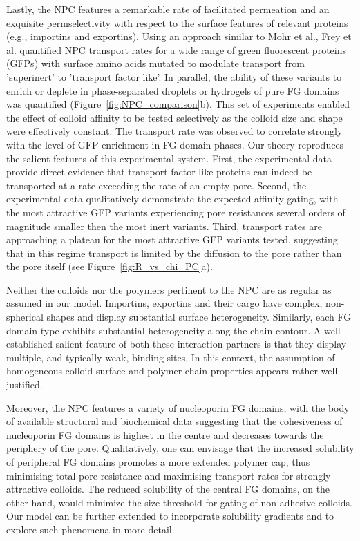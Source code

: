 \documentclass[12pt, a4paper]{article}
\begin{document}
Lastly, the NPC features a remarkable rate of facilitated permeation and an exquisite permselectivity with respect to the surface features of relevant proteins (e.g., importins and exportins).
Using an approach similar to Mohr et al., Frey et al. quantified NPC transport rates for a wide range of green fluorescent proteins (GFPs) with surface amino acids mutated to modulate transport from 'superinert' to 'transport factor like'.
In parallel, the ability of these variants to enrich or deplete in phase-separated droplets or hydrogels of pure FG domains was quantified (Figure~\ref{fig:NPC_comparison}b).
This set of experiments enabled the effect of colloid affinity to be tested selectively as the colloid size and shape were effectively constant.
The transport rate was observed to correlate strongly with the level of GFP enrichment in FG domain phases.
Our theory reproduces the salient features of this experimental system.
First, the experimental data provide direct evidence that transport-factor-like proteins can indeed be transported at a rate exceeding the rate of an empty pore.
Second, the experimental data qualitatively demonstrate the expected affinity gating, with the most attractive GFP variants experiencing pore resistances several orders of magnitude smaller then the most inert variants.
Third, transport rates are approaching a plateau for the most attractive GFP variants tested, suggesting that in this regime transport is limited by the diffusion to the pore rather than the pore itself (see Figure~\ref{fig:R_vs_chi_PC}a).

Neither the colloids nor the polymers pertinent to the NPC are as regular as assumed in our model.
Importins, exportins and their cargo have complex, non-spherical shapes and display substantial surface heterogeneity.
Similarly, each FG domain type exhibits substantial heterogeneity along the chain contour.
A well-established salient feature of both these interaction partners is that they display multiple, and typically weak, binding sites. In this context, the assumption of homogeneous colloid surface and polymer chain properties appears rather well justified. 

Moreover, the NPC features a variety of nucleoporin FG domains, with the body of available structural and biochemical data suggesting that the cohesiveness of nucleoporin FG domains is highest in the centre and decreases towards the periphery of the pore.
Qualitatively, one can envisage that the increased solubility of peripheral FG domains promotes a more extended polymer cap, thus minimising total pore resistance and maximising transport rates for strongly attractive colloids.
The reduced solubility of the central FG domains, on the other hand, would minimize the size threshold for gating of non-adhesive colloids.
Our model can be further extended to incorporate  solubility gradients and to explore such phenomena in more detail.
\end{document}
